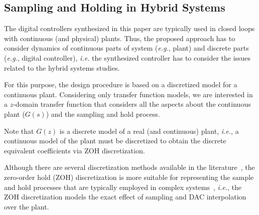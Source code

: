 \documentclass{sig-alternate-05-2015}
\newcommand{\red}[1]{{\color{red}#1}}
\begin{document}

\subsection{Sampling and Holding in Hybrid Systems}
\label{ssec:SandH}

The digital controllers synthesized in this paper are typically used in closed loops with continuous (and physical) plants. Thus, the proposed approach has to consider dynamics of continuous parts of system ({\it e.g.}, plant) and discrete parts ({\it e.g.}, digital controller), {\it i.e.} the synthesized controller has to consider the issues related to the hybrid systems studies.

For this purpose, the design procedure is based on a discretized model for a continuous plant. Considering only transfer function models, we are interested in a $z$-domain transfer function that considers all the aspects about the continuous plant ($G(s)$) and the sampling and hold process.

Note that $G(z)$ is a discrete model of a real (and continuous) plant, {\it
i.e.}, a continuous model of the plant must be discretized to obtain the
discrete equivalent coefficients via ZOH
discretization.  


Although there are several discretization methods available
in the literature~\cite{Franklin15}, the zero-order hold (ZOH)
discretization is more suitable for representing the sample and hold
processes that are typically employed in complex systems~\cite{istepanian2012digital}, {\it i.e.}, the ZOH discretization
models the exact effect of sampling and DAC interpolation over the plant.
\end{document}
